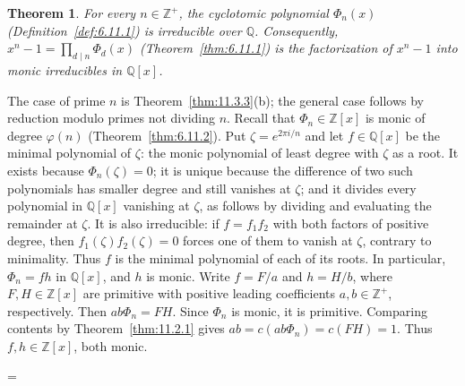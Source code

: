 \documentclass[11pt]{article}
\makeatletter
\let\nt@closedisplay\]
\def\nt@guardedclose{\@ifnextchar\par{\nt@closeafterpar}{\@ifnextchar\end{\postdisplaypenalty\@M\nt@closedisplay}{\nt@closedisplay}}}
\def\nt@closeafterpar\par{\@ifnextchar\par{\nt@closeafterpar}{\@ifnextchar\end{\postdisplaypenalty\@M\nt@closedisplay\par}{\nt@closedisplay\par}}}
\renewenvironment{proof}[1][\proofname]{\par
  \pushQED{\qed}\normalfont\topsep\medskipamount\edef\nt@afterproof{\@endparpenalty=\the\@endparpenalty\relax}\@beginparpenalty\@M\@endparpenalty\@M\let\]\nt@guardedclose\trivlist\item[]\textit{#1\@addpunct{.}} \ignorespaces}{\ifvmode\addpenalty\@M\fi\popQED\nt@afterproof\endtrivlist\@endpefalse}
\theoremstyle{ntstyle}
\newtheorem{theorem}{Theorem}[subsection]
\makeatother
\begin{document}
\begin{theorem}\label{thm:11.3.4} For every $n\in\mathbb{Z}^+$, the
  cyclotomic polynomial $\Phi_n(x)$ (Definition~\ref{def:6.11.1}) is
  irreducible over $\mathbb{Q}$. Consequently, $x^{n} - 1 = \prod_{d\mid n}\Phi_d(x)$ (Theorem~\ref{thm:6.11.1}) is
  the factorization of
  $x^{n} - 1$ into monic irreducibles in $\mathbb{Q}[x]$.

\end{theorem}

\begin{proof} The case of prime $n$ is Theorem~\ref{thm:11.3.3}(b); the general case follows by reduction modulo
  primes not dividing $n$. Recall that $\Phi_n\in\mathbb{Z}[x]$ is monic of
  degree $\varphi(n)$ (Theorem~\ref{thm:6.11.2}). Put $\zeta = e^{2\pi i/n}$ and let $f\in\mathbb{Q}[x]$ be the
  minimal polynomial of
  $\zeta$: the monic polynomial of least degree with $\zeta$ as a root.
  It exists because $\Phi_n(\zeta) = 0$; it is unique because the difference of two
such polynomials has smaller degree and still vanishes at $\zeta$;
and it divides every polynomial in $\mathbb{Q}[x]$ vanishing at
$\zeta$, as follows by dividing and evaluating the remainder at $\zeta$. It is also
  irreducible: if $f=f_1f_2$ with both factors of positive degree, then
  $f_1(\zeta)f_2(\zeta)=0$ forces one of them to vanish at $\zeta$,
  contrary to minimality. Thus $f$ is the minimal polynomial of each of
  its roots. In particular, $\Phi_n=fh$ in $\mathbb{Q}[x]$, and $h$ is monic.
  Write $f=F/a$ and $h=H/b$, where $F,H\in\mathbb{Z}[x]$ are
  primitive with positive leading coefficients $a,b\in\mathbb{Z}^+$,
  respectively. Then $ab\Phi_n=FH$. Since $\Phi_n$ is monic, it is
  primitive. Comparing contents by Theorem~\ref{thm:11.2.1} gives
  $ab=c(ab\Phi_n)=c(FH)=1$. Thus $f,h\in\mathbb{Z}[x]$, both monic.


\end{proof}
\end{document}
